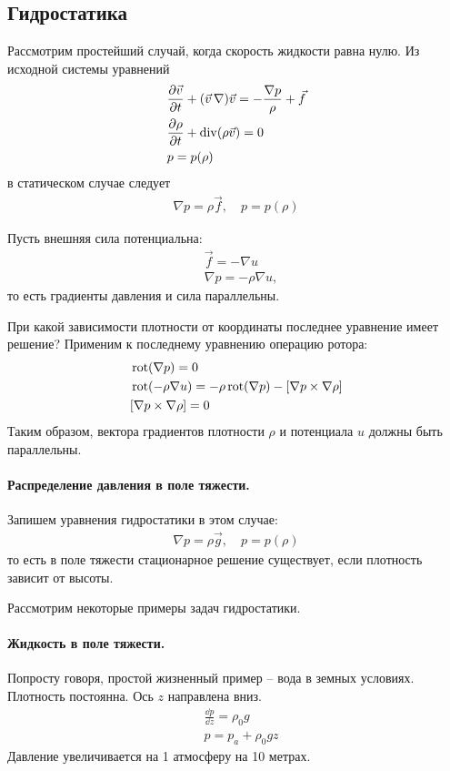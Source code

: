 \subsection{Гидростатика}
Рассмотрим простейший случай, когда скорость жидкости равна нулю. Из исходной системы уравнений 
\begin{align*}
& \frac { \partial \vec{v} } { \partial t } + ( \vec{v}\,\nabla ) \vec{v} = - \frac { \nabla p } { \rho } + \vec { f } \\
& \frac { \partial \rho } { \partial t } + \operatorname{div} ( \rho \vec{v} ) = 0 \\
& p = p ( \rho )
\end{align*}
в статическом случае следует
\begin{align*}
\nabla p = \rho \vec { f }, \quad 
p = p ( \rho )
\end{align*}

Пусть внешняя сила потенциальна:
\begin{align*}
& \vec { f } = - \nabla u \\
& \nabla p = - \rho \nabla u,
\end{align*}
то есть градиенты давления и сила параллельны.

При какой зависимости плотности от координаты последнее уравнение имеет решение? Применим к последнему уравнению операцию ротора:
\begin{align*}
&\operatorname{rot}( \nabla p ) = 0 \\
&\operatorname{rot}( - \rho \nabla u ) = - \rho\operatorname{rot}( \nabla p ) - [ \nabla p \times \nabla \rho ] \\ 
& [ \nabla p \times \nabla \rho ] = 0
\end{align*}
Таким образом,  вектора градиентов плотности $\rho$ и потенциала $u$ должны быть параллельны.

\paragraph{Распределение давления в поле тяжести.} Запишем уравнения гидростатики в этом случае:
\begin{align*}
\nabla p = \rho \vec { g }, \quad p = p ( \rho )
\end{align*}
то есть в поле тяжести стационарное решение существует, если плотность зависит от высоты.

Рассмотрим некоторые примеры задач гидростатики.

\paragraph{Жидкость в поле тяжести.} Попросту говоря, простой жизненный пример -- вода в земных условиях.
Плотность постоянна. Ось $z$ направлена вниз.
	\begin{align*}
	& \frac { \dd p } { \dd z } = \rho_0 g \\
	& p = p_a + \rho_0 g z
	\end{align*}
	Давление увеличивается на 1 атмосферу на 10 метрах.

